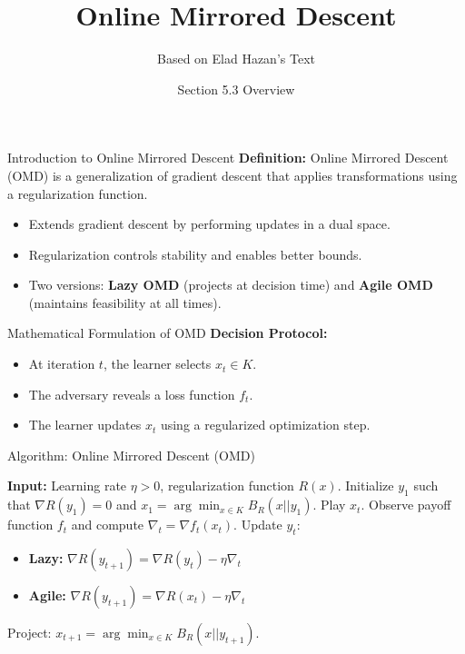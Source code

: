 \documentclass{beamer}
\title{Online Mirrored Descent}
\author{Based on Elad Hazan's Text}
\date{Section 5.3 Overview}
\begin{document}
\frame{\titlepage}

\begin{frame}{Introduction to Online Mirrored Descent}
    \textbf{Definition:} Online Mirrored Descent (OMD) is a generalization of gradient descent that applies transformations using a regularization function.
    \begin{itemize}
        \item Extends gradient descent by performing updates in a dual space.
        \item Regularization controls stability and enables better bounds.
        \item Two versions: \textbf{Lazy OMD} (projects at decision time) and \textbf{Agile OMD} (maintains feasibility at all times).
    \end{itemize}
\end{frame}

\begin{frame}{Mathematical Formulation of OMD}
    \textbf{Decision Protocol:}
    \begin{itemize}
        \item At iteration $t$, the learner selects $x_t \in K$.
        \item The adversary reveals a loss function $f_t$.
        \item The learner updates $x_t$ using a regularized optimization step.
    \end{itemize}
\end{frame}

\begin{frame}{Algorithm: Online Mirrored Descent (OMD)}
    \begin{algorithm}[H]
        \caption{Online Mirrored Descent}
        \begin{algorithmic}[1]
            \State \textbf{Input:} Learning rate $\eta > 0$, regularization function $R(x)$.
            \State Initialize $y_1$ such that $\nabla R(y_1) = 0$ and $x_1 = \arg\min_{x \in K} B_R(x || y_1)$.
                \State Play $x_t$.
                \State Observe payoff function $f_t$ and compute $\nabla_t = \nabla f_t(x_t)$.
                \State Update $y_t$:
                \begin{itemize}
                    \item \textbf{Lazy:} $\nabla R(y_{t+1}) = \nabla R(y_t) - \eta \nabla_t$
                    \item \textbf{Agile:} $\nabla R(y_{t+1}) = \nabla R(x_t) - \eta \nabla_t$
                \end{itemize}
                \State Project: $x_{t+1} = \arg\min_{x \in K} B_R(x || y_{t+1})$.
            \EndFor
        \end{algorithmic}
    \end{algorithm}
\end{frame}
\end{document}
